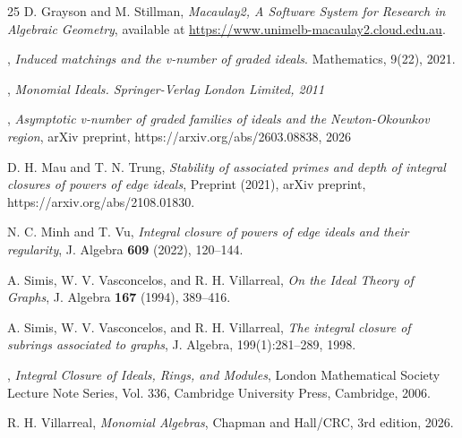 \documentclass[11pt,reqno,a4paper]{amsart}
\theoremstyle{definition}
\begin{document}
\begin{thebibliography}{25}
 D. Grayson and M. Stillman, \textit{Macaulay2, A Software System for Research in Algebraic Geometry}, available at \url{https://www.unimelb-macaulay2.cloud.edu.au}.


, \textit {Induced matchings and the v-number of graded ideals}.
Mathematics, 9(22), 2021.


, {\textit {Monomial Ideals. Springer-Verlag London Limited, 2011}}


,\textit { Asymptotic v-number of graded families of ideals  and the Newton-Okounkov region}, arXiv preprint, https://arxiv.org/abs/2603.08838, 2026

D. H. Mau and T. N. Trung,
\textit{Stability of associated primes and depth of integral closures of powers of edge ideals},
Preprint (2021), arXiv preprint, https://arxiv.org/abs/2108.01830.



 N. C. Minh and T. Vu, \textit{Integral closure of powers of edge ideals and their regularity}, J. Algebra \textbf{609} (2022), 120--144.


A. Simis, W. V. Vasconcelos, and R. H. Villarreal,
\textit{On the Ideal Theory of Graphs},
J. Algebra \textbf{167} (1994), 389--416.


A. Simis, W. V. Vasconcelos, and R. H. Villarreal,
\textit{The integral closure of subrings associated to graphs},
J. Algebra, 199(1):281--289, 1998.

,{\textit{ Integral Closure of Ideals, Rings, and Modules}, London Mathematical Society Lecture Note Series, Vol. 336, Cambridge University Press, Cambridge, 2006.}

 R. H. Villarreal, \textit{Monomial Algebras}, Chapman and Hall/CRC, 3rd edition, 2026.


    
\end{thebibliography}
\end{document}

